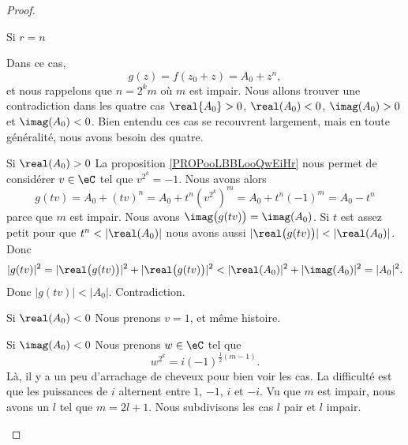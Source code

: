 \begin{proof}
\begin{subproof}
        \item[Si \( r=n\)]

            Dans ce cas,
            \begin{equation}
                g(z)=f(z_0+z)=A_0+z^n,
            \end{equation}
            et nous rappelons que \( n=2^km\) où \( m\) est impair. Nous allons trouver une contradiction dans les quatre cas \( \real{A_0}>0\), \( \real(A_0)<0\), \( \imag(A_0)>0\) et \( \imag(A_0)<0\). Bien entendu ces cas se recouvrent largement, mais en toute généralité, nous avons besoin des quatre.
            \begin{subproof}
                \item[Si \( \real(A_0)>0\)]
                    La proposition \ref{PROPooLBBLooQwEiHr} nous permet de considérer \( v\in \eC\) tel que \( v^{2^k}=-1\). Nous avons alors
                    \begin{equation}
                        g(tv)=A_0+(tv)^n=A_0+t^n(v^{2^k})^m=A_0+t^n(-1)^m=A_0-t^n
                    \end{equation}
                    parce que \( m\) est impair. Nous avons \( \imag\big( g(tv) \big)=\imag(A_0)\). Si \( t\) est assez petit pour que \( t^n<| \real(A_0) |\) nous avons aussi \( |\real\big( g(tv) \big)|<| \real(A_0) |\). Donc
                    \begin{equation}
                        | g(tv) |^2=| \real\big( g(tv) \big) |^2+| \real\big( g(tv) \big) |^2<| \real(A_0) |^2+| \imag(A_0) |^2=| A_0 |^2.
                    \end{equation}
                    Donc \( | g(tv) |<| A_0 |\). Contradiction.
                \item[Si \( \real(A_0)<0\)]
                    Nous prenons \( v=1\), et même histoire.
                \item[Si \( \imag(A_0)<0\)]
                    Nous prenons \( w\in \eC\) tel que
                    \begin{equation}
                        w^{2^k}=i(-1)^{\frac{ 1 }{2}(m-1)}.
                    \end{equation}
                    Là, il y a un peu d'arrachage de cheveux pour bien voir les cas. La difficulté est que les puissances de \( i\) alternent entre \( 1\), \( -1\), \( i\) et \( -i\). Vu que \( m\) est impair, nous avons un \( l\) tel que \( m=2l+1\). Nous subdivisons les cas \( l\) pair et \( l\) impair.
                    \begin{subproof}

\end{subproof}
\end{subproof}
\end{subproof}
\end{proof}
